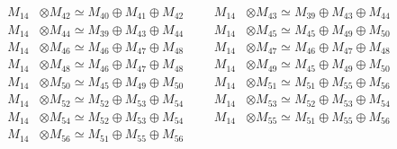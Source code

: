 \begin{align*}
M_{14} &\otimes M_{42} \simeq M_{40} \oplus M_{41} \oplus M_{42} &&& M_{14} &\otimes M_{43} \simeq M_{39} \oplus M_{43} \oplus M_{44}\\
M_{14} &\otimes M_{44} \simeq M_{39} \oplus M_{43} \oplus M_{44} &&& M_{14} &\otimes M_{45} \simeq M_{45} \oplus M_{49} \oplus M_{50}\\
M_{14} &\otimes M_{46} \simeq M_{46} \oplus M_{47} \oplus M_{48} &&& M_{14} &\otimes M_{47} \simeq M_{46} \oplus M_{47} \oplus M_{48}\\
M_{14} &\otimes M_{48} \simeq M_{46} \oplus M_{47} \oplus M_{48} &&& M_{14} &\otimes M_{49} \simeq M_{45} \oplus M_{49} \oplus M_{50}\\
M_{14} &\otimes M_{50} \simeq M_{45} \oplus M_{49} \oplus M_{50} &&& M_{14} &\otimes M_{51} \simeq M_{51} \oplus M_{55} \oplus M_{56}\\
M_{14} &\otimes M_{52} \simeq M_{52} \oplus M_{53} \oplus M_{54} &&& M_{14} &\otimes M_{53} \simeq M_{52} \oplus M_{53} \oplus M_{54}\\
M_{14} &\otimes M_{54} \simeq M_{52} \oplus M_{53} \oplus M_{54} &&& M_{14} &\otimes M_{55} \simeq M_{51} \oplus M_{55} \oplus M_{56}\\
M_{14} &\otimes M_{56} \simeq M_{51} \oplus M_{55} \oplus M_{56}
\end{align*}

